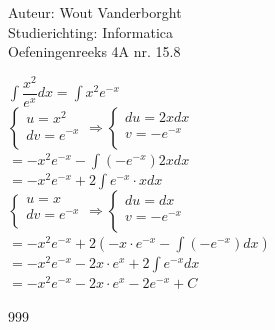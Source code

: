 \documentclass[a4paper]{article}
\newcommand{\Int}{\displaystyle\int}
\begin{document}
  
\noindent \large Auteur: Wout Vanderborght\\
\noindent \large Studierichting: Informatica\\
\noindent \large Oefeningenreeks 4A nr. 15.8\\

\medskip

\normalsize

$ \Int \dfrac{x^2}{e^x}dx = \Int x^2e^{-x} $ \\

$\left\{
\begin{array}{l}
    u = x^2 \\
    dv = e^{-x} \\
\end{array} \right. 
\Rightarrow \left\{
\begin{array}{l}
    du = 2xdx \\
    v = -e^{-x} \\
\end{array} \right. 
$ \\

$ = -x^2e^{-x} - \Int \left(-e^{-x}\right) 2xdx $ \\ 

$ = -x^2e^{-x} + 2\Int e^{-x} \cdot xdx $ \\

$\left\{
\begin{array}{l}
    u = x \\
    dv = e^{-x} \\
\end{array} \right. 
\Rightarrow \left\{
\begin{array}{l}
    du = dx \\
    v = -e^{-x} \\
\end{array} \right. 
$ \\

$ = -x^2e^{-x} + 2\left(-x \cdot e^{-x} - \Int \left(-e^{-x}\right)dx \right) $ \\

$ = -x^2e^{-x} -2x \cdot e^x + 2\Int e^{-x}dx $ \\

$ = -x^2e^{-x} -2x \cdot e^x - 2e^{-x} + C $ \\

\begin{thebibliography}{999}
\end{thebibliography}
\end{document}

